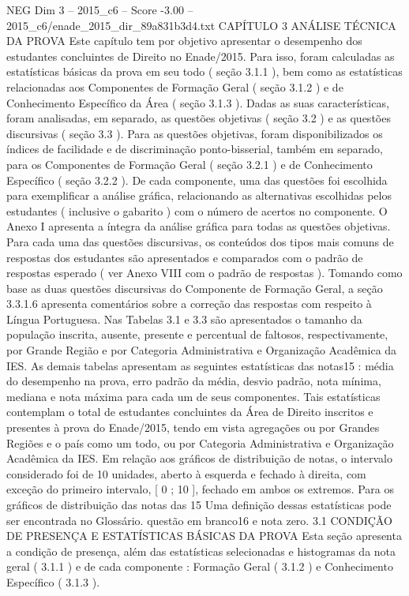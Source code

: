 \begin{textsample}{NEG Dim 3 – 2015\_c6 – Score -3.00 – 2015\_c6/enade\_2015\_dir\_89a831b3d4.txt}  \label{ex:f3_neg_067}
CAPÍTULO 3 ANÁLISE TÉCNICA DA PROVA Este capítulo tem por objetivo apresentar o desempenho dos estudantes concluintes de Direito no Enade/2015.
Para isso, foram calculadas as estatísticas básicas da prova em seu todo ( seção 3.1.1 ), bem como as estatísticas relacionadas aos Componentes de Formação Geral ( seção 3.1.2 ) e de Conhecimento Específico da Área ( seção 3.1.3 ).
Dadas as suas características, foram analisadas, em separado, as questões objetivas ( seção 3.2 ) e as questões discursivas ( seção 3.3 ).
Para as questões objetivas, foram disponibilizados os índices de facilidade e de discriminação ponto-bisserial, também em separado, para os Componentes de Formação Geral ( seção 3.2.1 ) e de Conhecimento Específico ( seção 3.2.2 ).
De cada componente, uma das questões foi escolhida para exemplificar a análise gráfica, relacionando as alternativas escolhidas pelos estudantes ( inclusive o gabarito ) com o número de acertos no componente.
O Anexo I apresenta a íntegra da análise gráfica para todas as questões objetivas.
Para cada uma das questões discursivas, os conteúdos dos tipos mais comuns de respostas dos estudantes são apresentados e comparados com o padrão de respostas esperado ( ver Anexo VIII com o padrão de respostas ).
Tomando como base as duas questões discursivas do Componente de Formação Geral, a seção 3.3.1.6 apresenta comentários sobre a correção das respostas com respeito à Língua Portuguesa.
Nas Tabelas 3.1 e 3.3 são apresentados o tamanho da população inscrita, ausente, presente e percentual de faltosos, respectivamente, por Grande Região e por Categoria Administrativa e Organização Acadêmica da IES.
As demais tabelas apresentam as seguintes estatísticas das notas15 : média do desempenho na prova, erro padrão da média, desvio padrão, nota mínima, mediana e nota máxima para cada um de seus componentes.
Tais estatísticas contemplam o total de estudantes concluintes da Área de Direito inscritos e presentes à prova do Enade/2015, tendo em vista agregações ou por Grandes Regiões e o país como um todo, ou por Categoria Administrativa e Organização Acadêmica da IES.
Em relação aos gráficos de distribuição de notas, o intervalo considerado foi de 10 unidades, aberto à esquerda e fechado à direita, com exceção do primeiro intervalo, [ 0 ; 10 ], fechado em ambos os extremos.
Para os gráficos de distribuição das notas das 15 Uma definição dessas estatísticas pode ser encontrada no Glossário. questão em branco16 e nota zero. 3.1 CONDIÇÃO DE PRESENÇA E ESTATÍSTICAS BÁSICAS DA PROVA Esta seção apresenta a condição de presença, além das estatísticas selecionadas e histogramas da nota geral ( 3.1.1 ) e de cada componente : Formação Geral ( 3.1.2 ) e Conhecimento Específico ( 3.1.3 ).

\end{textsample}
